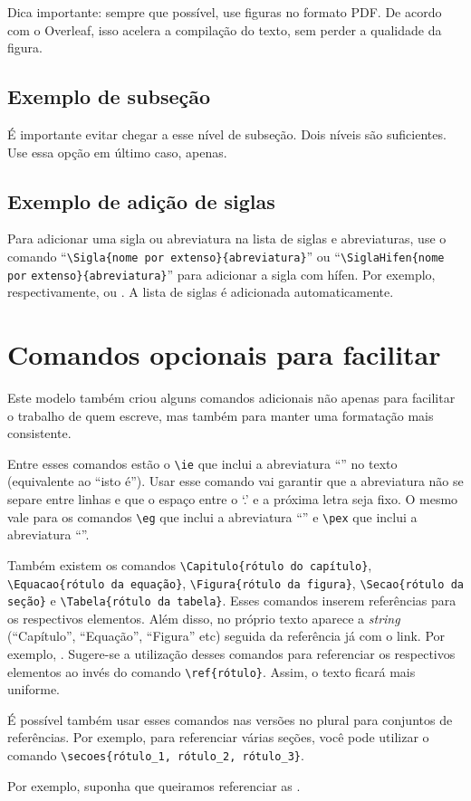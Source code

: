 Dica importante: sempre que possível, use figuras no formato PDF. De acordo com o Overleaf, isso acelera a compilação do texto, sem perder a qualidade da figura. 

\subsection{Exemplo de subseção}\label{subsec:exemploSubsec}
É importante evitar chegar a esse nível de subseção. Dois níveis são suficientes. Use essa opção em último caso, apenas.


\subsection{Exemplo de adição de siglas}\label{subsec:siglas}
Para adicionar uma sigla ou abreviatura na lista de siglas e abreviaturas, use o comando ``\texttt{\textbackslash{}Sigla\{nome por extenso\}\{abreviatura\}}'' ou ``\texttt{\textbackslash{}SiglaHifen\{nome por} \texttt{ex\-ten\-so\}\{abreviatura\}}'' para adicionar a sigla com hífen. 
Por exemplo, respectivamente,  ou . A lista de siglas é adicionada automaticamente.

\section{Comandos opcionais para facilitar}\label{sec:comandosOpc}
Este modelo também criou alguns comandos adicionais não apenas para facilitar o trabalho de quem escreve, mas também para manter uma formatação mais consistente.

Entre esses comandos estão o \texttt{\textbackslash{}ie} que inclui a abreviatura ``\ie'' no texto (equivalente ao ``isto é''). Usar esse comando vai garantir que a abreviatura não se separe entre linhas e que o espaço entre o `.' e a próxima letra seja fixo. O mesmo vale para os comandos \texttt{\textbackslash{}eg} que inclui a abreviatura ``\eg'' e \texttt{\textbackslash{}pex} que inclui a abreviatura ``\pex''.

Também existem os comandos \texttt{\textbackslash{}Capitulo\{rótulo do capítulo\}}, \texttt{\textbackslash{}Equacao\{ró\-tu\-lo da equação\}}, \texttt{\textbackslash{}Figura\{rótulo da figura\}}, \texttt{\textbackslash{}Secao\{rótulo da seção\}} e \texttt{\textbackslash{}Tabela\{rótulo da tabela\}}. Esses comandos inserem referências para os respectivos elementos. Além disso, no próprio texto aparece a \textit{string} (``Capítulo'', ``Equação'', ``Figura'' etc) seguida da referência já com o link. Por exemplo, . Sugere-se a utilização desses comandos para referenciar os respectivos elementos ao invés do comando \texttt{\textbackslash{}ref\{rótulo\}}. Assim, o texto ficará mais uniforme. 

É possível também usar esses comandos nas versões no plural para conjuntos de referências. Por exemplo, para referenciar várias seções, você pode utilizar o comando \texttt{\textbackslash{}secoes\{ró\-tu\-lo\_1, rótulo\_2, rótulo\_3\}}.

Por exemplo, suponha que queiramos referenciar as .